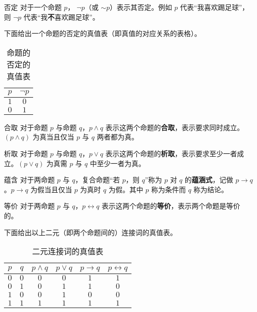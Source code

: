 
\begin{definition}{否定}
对于一个命题 $p$， $\neg p$（或 $\sim p$）表示其否定。例如 $p$ 代表“我喜欢踢足球”，则 $\neg p$ 代表“我\textbf{不}喜欢踢足球”。
\end{definition}

下面给出一个命题的否定的真值表（即真值的对应关系的表格）。
\begin{table}[ht]
\centering
\caption{命题的否定的真值表}\label{tab_propco1}
\begin{tabular}{|c|c|}
\hline
$p$ & $\neg p$ \\
\hline
$1$ & $0$ \\
\hline
$0$ & $1$ \\
\hline
\end{tabular}
\end{table}


\begin{definition}{合取}
对于命题 $p$ 与命题 $q$，$p \land q$ 表示这两个命题的\textbf{合取}，表示要求同时成立。$(p \land q)$ 为真当且仅当 $p$ 与 $q$ 两者都为真。
\end{definition}

\begin{definition}{析取}
对于命题 $p$ 与命题 $q$，$p \lor q$ 表示这两个命题的\textbf{析取}，表示要求至少一者成立。$(p \lor q)$ 为真需 $p$ 与 $q$ 中至少一者为真。
\end{definition}

\begin{definition}{蕴含}
对于两命题 $p$ 与 $q$，复合命题“若 $p$，则 $q$”称为 $p$ 对 $q$ 的\textbf{蕴涵式}，记做 $p \to q$。$p \to q$ 为假当且仅当 $p$ 为真时 $q$ 为假。其中 $p$ 称为条件而 $q$ 称为结论。
\end{definition}

\begin{definition}{等价}
对于两命题 $p$ 与 $q$，$p \leftrightarrow q$ 表示这两个命题的\textbf{等价}，表示两个命题是等价的。
\end{definition}

下面给出以上二元（即两个命题间的）连接词的真值表。
\begin{table}[ht]
\centering
\caption{二元连接词的真值表}\label{tab_propco2}
\begin{tabular}{|c|c|c|c|c|c|}
\hline
$p$ & $q$ & $p \land q$ & $p \lor q$ & $p \to q$ & $p \leftrightarrow q$ \\
\hline
$0$ & $0$ & $0$ & $0$ & $1$ & $1$ \\
\hline
$0$ & $1$ & $0$ & $1$ & $1$ & $0$ \\
\hline
$1$ & $0$ & $0$ & $1$ & $0$ & $0$ \\
\hline
$1$ & $1$ & $1$ & $1$ & $1$ & $1$ \\
\hline
\end{tabular}
\end{table}


